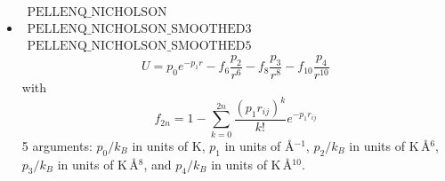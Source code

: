 \begin{itemize}
\item{$\begin{array}{l}\text{PELLENQ\_NICHOLSON}\\
      \text{PELLENQ\_NICHOLSON\_SMOOTHED3}\\
      \text{PELLENQ\_NICHOLSON\_SMOOTHED5}\end{array}$}\\
  \begin{equation}
    U= p_0 e^{-p_1 r}-f_6 \frac{p_2}{r^6}-f_8\frac{p_3}{r^8}-f_{10}\frac{p_4}{r^{10}}
  \end{equation}
  with
  \begin{equation}
   f_{2n}=1-\sum_{k=0}^{2n}\frac{\left(p_1 r_{ij}\right)^k}{k!} e^{-p_1 r_{ij}}
  \end{equation}
  5 arguments: $p_0/k_B$ in units of K, $p_1$ in units of \AA$^{-1}$, $p_2/k_B$ in units of K\,\AA$^{6}$,
  $p_3/k_B$ in units of K\,\AA$^{8}$, and $p_4/k_B$ in units of K\,\AA$^{10}$.


\end{itemize}
